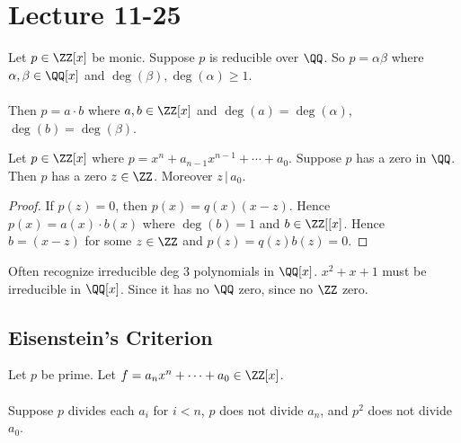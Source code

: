 \documentclass[class=scrartcl, crop=false]{standalone}
\date{2019-11-25}
\begin{document}
\section{Lecture 11-25}

\begin{lemma}
  Let $p \in \ZZ[x]$ be monic. Suppose $p$ is reducible over $\QQ$. So $p = \alpha \beta$ where $\alpha, \beta \in \QQ[x]$ and $\deg(\beta), \deg(\alpha) \geq 1$.
  \\\\
  Then $p = a \cdot b$ where $a, b \in \ZZ[x]$ and $\deg(a) = \deg(\alpha)$, $\deg(b) = \deg(\beta)$.
\end{lemma} 

\begin{corollary}
  Let $p \in \ZZ[x]$ where $p = x^n + a_{n - 1}x^{n - 1} + \cdots + a_0$. Suppose $p$ has a zero in $\QQ$. Then $p$ has a zero $z \in \ZZ$. Moreover $z \, | \, a_0$.
\end{corollary} 

\begin{proof}
  If $p(z) = 0$, then $p(x) = q(x)(x - z)$. Hence $p(x) = a(x) \cdot b(x)$ where $\deg(b) = 1$ and $b \in \ZZ[[x]$. Hence $b = (x - z)$ for some $z \in \ZZ$ and $p(z) = q(z)b(z) = 0$.
\end{proof}  \noindent
Often recognize irreducible deg 3 polynomials in $\QQ[x]$. $x^2 + x + 1$ must be irreducible in $\QQ[x]$. Since it has no $\QQ$ zero, since no $\ZZ$ zero.

\subsection{Eisenstein's Criterion}

Let $p$ be prime. Let $f = a_nx^n + \cdots + a_0 \in \ZZ[x]$.
\\\\
Suppose $p$ divides each $a_i$ for $i < n$, $p$ does not divide $a_n$, and $p^2$ does not divide $a_0$.
\end{document}
